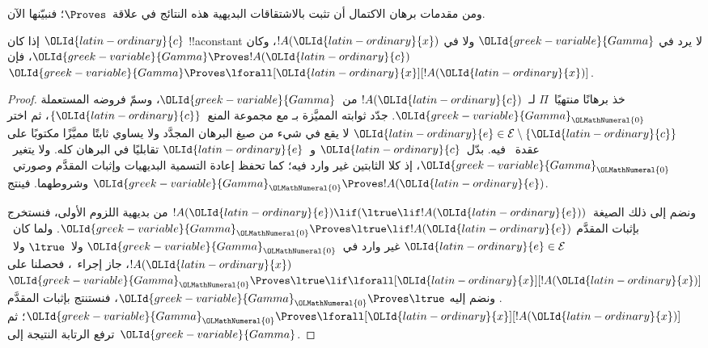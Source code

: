 \documentclass[../../../include/open-logic-section]{subfiles}
\begin{document}


\begin{explain}
  ومن مقدمات برهان الاكتمال أن تثبت بالاشتقاقات البديهية هذه
  النتائج في علاقة~$\Proves$؛ فنبيّنها الآن.
\end{explain}

\begin{thm}
 إذا كان $\OLId{latin-ordinary}{c}$ !!a{constant} لا يرد
في $\OLId{greek-variable}{Gamma}$ ولا في $!A(\OLId{latin-ordinary}{x})$، وكان $\OLId{greek-variable}{Gamma} \Proves !A(\OLId{latin-ordinary}{c})$، فإن $\OLId{greek-variable}{Gamma}
\Proves \lforall[\OLId{latin-ordinary}{x}][!A(\OLId{latin-ordinary}{x})]$.
\end{thm}

\begin{proof}
خذ برهانًا منتهيًا~$\Pi$ لـ~$!A(\OLId{latin-ordinary}{c})$ من~$\OLId{greek-variable}{Gamma}$، وسمّ فروضه المستعملة
$\OLId{greek-variable}{Gamma}_\OLMathNumeral{0}$. جدّد ثوابته المميَّزة بـ
   مع مجموعة المنع~$\{\OLId{latin-ordinary}{c}\}$، ثم اختر
$\OLId{latin-ordinary}{e}\in\mathcal E\setminus\{\OLId{latin-ordinary}{c}\}$ لا يقع في شيء من صيغ البرهان المجدَّد ولا يساوي ثابتًا
مميَّزًا مكتوبًا على عقدة~\QR{} فيه. بدّل~$\OLId{latin-ordinary}{c}$ و~$\OLId{latin-ordinary}{e}$ تقابليًا في البرهان
كله. ولا يتغير~$\OLId{greek-variable}{Gamma}_\OLMathNumeral{0}$، إذ كلا الثابتين غير وارد فيه؛ كما تحفظ إعادة
التسمية البديهيات وإثبات المقدَّم وصورتي~\QR{} وشروطهما. فينتج
$\OLId{greek-variable}{Gamma}_\OLMathNumeral{0}\Proves !A(\OLId{latin-ordinary}{e})$.

  ونضم إلى ذلك الصيغة~$!A(\OLId{latin-ordinary}{e})\lif(\ltrue\lif !A(\OLId{latin-ordinary}{e}))$ من بديهية اللزوم
  الأولى، فنستخرج بإثبات المقدَّم
  $\OLId{greek-variable}{Gamma}_\OLMathNumeral{0}\Proves\ltrue\lif !A(\OLId{latin-ordinary}{e})$. ولما كان~$\OLId{latin-ordinary}{e}\in\mathcal E$ غير وارد
في~$\OLId{greek-variable}{Gamma}_\OLMathNumeral{0}$ ولا~$\ltrue$ ولا~$!A(\OLId{latin-ordinary}{x})$، جاز إجراء~\QR{}، فحصلنا على
$\OLId{greek-variable}{Gamma}_\OLMathNumeral{0}\Proves\ltrue\lif\lforall[\OLId{latin-ordinary}{x}][!A(\OLId{latin-ordinary}{x})]$. ونضم إليه
$\OLId{greek-variable}{Gamma}_\OLMathNumeral{0}\Proves\ltrue$، فنستنتج بإثبات المقدَّم
$\OLId{greek-variable}{Gamma}_\OLMathNumeral{0}\Proves\lforall[\OLId{latin-ordinary}{x}][!A(\OLId{latin-ordinary}{x})]$؛ ثم ترفع الرتابة النتيجة إلى~$\OLId{greek-variable}{Gamma}$.
\end{proof}
\end{document}
